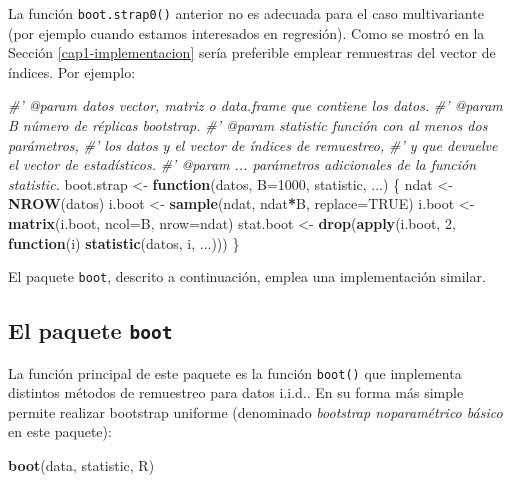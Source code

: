 \documentclass[]{book}
\newenvironment{Shaded}{\begin{snugshade}}{\end{snugshade}}
\newcommand{\KeywordTok}[1]{\textcolor[rgb]{0.13,0.29,0.53}{\textbf{#1}}}
\newcommand{\DataTypeTok}[1]{\textcolor[rgb]{0.13,0.29,0.53}{#1}}
\newcommand{\DecValTok}[1]{\textcolor[rgb]{0.00,0.00,0.81}{#1}}
\newcommand{\StringTok}[1]{\textcolor[rgb]{0.31,0.60,0.02}{#1}}
\newcommand{\CommentTok}[1]{\textcolor[rgb]{0.56,0.35,0.01}{\textit{#1}}}
\newcommand{\OtherTok}[1]{\textcolor[rgb]{0.56,0.35,0.01}{#1}}
\newcommand{\ControlFlowTok}[1]{\textcolor[rgb]{0.13,0.29,0.53}{\textbf{#1}}}
\newcommand{\OperatorTok}[1]{\textcolor[rgb]{0.81,0.36,0.00}{\textbf{#1}}}
\newcommand{\NormalTok}[1]{#1}
\theoremstyle{definition}
\theoremstyle{definition}
\theoremstyle{definition}
\theoremstyle{remark}
\begin{document}
La función \texttt{boot.strap0()} anterior no es adecuada para el caso
multivariante (por ejemplo cuando estamos interesados en regresión).
Como se mostró en la Sección \ref{cap1-implementacion} sería preferible
emplear remuestras del vector de índices. Por ejemplo:

\begin{Shaded}
\begin{Highlighting}[]
\CommentTok{#' @param datos vector, matriz o data.frame que contiene los datos.}
\CommentTok{#' @param B número de réplicas bootstrap.}
\CommentTok{#' @param statistic función con al menos dos parámetros, }
\CommentTok{#' los datos y el vector de índices de remuestreo, }
\CommentTok{#' y que devuelve el vector de estadísticos.}
\CommentTok{#' @param ... parámetros adicionales de la función statistic.}
\NormalTok{boot.strap <-}\StringTok{ }\ControlFlowTok{function}\NormalTok{(datos, }\DataTypeTok{B=}\DecValTok{1000}\NormalTok{, statistic, ...) \{}
\NormalTok{  ndat <-}\StringTok{ }\KeywordTok{NROW}\NormalTok{(datos)}
\NormalTok{  i.boot <-}\StringTok{ }\KeywordTok{sample}\NormalTok{(ndat, ndat}\OperatorTok{*}\NormalTok{B, }\DataTypeTok{replace=}\OtherTok{TRUE}\NormalTok{)}
\NormalTok{  i.boot <-}\StringTok{ }\KeywordTok{matrix}\NormalTok{(i.boot, }\DataTypeTok{ncol=}\NormalTok{B, }\DataTypeTok{nrow=}\NormalTok{ndat)}
\NormalTok{  stat.boot <-}\StringTok{ }\KeywordTok{drop}\NormalTok{(}\KeywordTok{apply}\NormalTok{(i.boot, }\DecValTok{2}\NormalTok{, }\ControlFlowTok{function}\NormalTok{(i) }\KeywordTok{statistic}\NormalTok{(datos, i, ...)))}
\NormalTok{\}}
\end{Highlighting}
\end{Shaded}

El paquete \texttt{boot}, descrito a continuación, emplea una
implementación similar.

\subsection{\texorpdfstring{El paquete
\texttt{boot}}{El paquete boot}}\label{cap1-pkgboot}

La función principal de este paquete es la función \texttt{boot()} que
implementa distintos métodos de remuestreo para datos i.i.d.. En su
forma más simple permite realizar bootstrap uniforme (denominado
\emph{bootstrap noparamétrico básico} en este paquete):

\begin{Shaded}
\begin{Highlighting}[]
\KeywordTok{boot}\NormalTok{(data, statistic, R)}
\end{Highlighting}
\end{Shaded}
\end{document}
